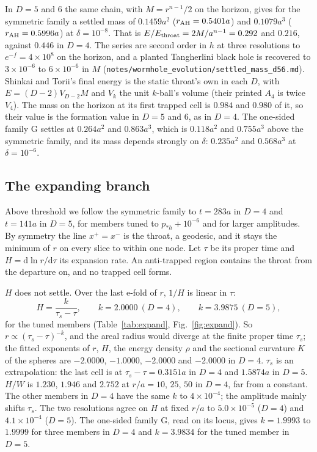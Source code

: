 \documentclass[11pt]{article}
\newcommand{\dd}{\mathrm{d}}
\newcommand{\pst}{p_{*h}}
\newcommand{\AH}{{\rm AH}}
\begin{document}
In $D=5$ and $6$ the same chain, with $M=r^{n-1}/2$ on the horizon, gives for the symmetric family a settled mass of
$0.1459a^{2}$ ($r_\AH=0.5401a$) and $0.1079a^{3}$ ($r_\AH=0.5996a$) at $\delta=10^{-8}$. That is $E/E_{\rm throat}=2M/a^{n-1}=0.292$
and $0.216$, against $0.446$ in $D=4$. The series are second order in $h$ at three resolutions to $e^{-f}=4\times10^{8}$ on the
horizon, and a planted Tangherlini black hole is recovered to $3\times10^{-6}$ to $6\times10^{-6}$ in $M$
(\texttt{notes/wormhole\_evolution/settled\_mass\_d56.md}). Shinkai and Torii's final energy is the static throat's own in each
$D$, with $E=(D-2)V_{D-2}M$ and $V_k$ the unit $k$-ball's volume (their printed $A_4$ is twice $V_4$). The mass on the horizon at its
first trapped cell is $0.984$ and $0.980$ of it, so their value is the formation value in $D=5$ and $6$, as in $D=4$. The one-sided
family G settles at $0.264a^{2}$ and $0.863a^{3}$, which is $0.118a^{2}$ and $0.755a^{3}$ above the symmetric family, and its mass
depends strongly on $\delta$: $0.235a^{2}$ and $0.568a^{3}$ at $\delta=10^{-6}$.

\subsection{The expanding branch}\label{sec:expand}

Above threshold we follow the symmetric family to $t=283a$ in $D=4$ and $t=141a$ in $D=5$, for members tuned to
$\pst+10^{-6}$ and for larger amplitudes. By symmetry the line $x^+=x^-$ is the throat, a geodesic, and it stays the
minimum of $r$ on every slice to within one node. Let $\tau$ be its proper time and $H=\dd\ln r/\dd\tau$ its expansion
rate. An anti-trapped region contains the throat from the departure on, and no trapped cell forms.

$H$ does not settle. Over the last e-fold of $r$, $1/H$ is linear in $\tau$:
\begin{equation}
H=\frac{k}{\tau_s-\tau},\qquad k=2.0000\ (D=4),\qquad k=3.9875\ (D=5),\label{eq:ft}
\end{equation}
for the tuned members (Table~\ref{tab:expand}, Fig.~\ref{fig:expand}). So $r\propto(\tau_s-\tau)^{-k}$, and the areal
radius would diverge at the finite proper time $\tau_s$; the fitted exponents of $r$, $H$, the energy density $\rho$ and
the sectional curvature $K$ of the spheres are $-2.0000$, $-1.0000$, $-2.0000$ and $-2.0000$ in $D=4$. $\tau_s$ is an
extrapolation: the last cell is at $\tau_s-\tau=0.3151a$ in $D=4$ and $1.5874a$ in $D=5$. $H/W$ is $1.230$, $1.946$ and
$2.752$ at $r/a=10$, $25$, $50$ in $D=4$, far from a constant. The other members in $D=4$ have the same $k$ to
$4\times10^{-4}$; the amplitude mainly shifts $\tau_s$. The two resolutions agree on $H$ at fixed $r/a$ to
$5.0\times10^{-5}$ ($D=4$) and $4.1\times10^{-4}$ ($D=5$). The one-sided family G, read on its locus, gives
$k=1.9993$ to $1.9999$ for three members in $D=4$ and $k=3.9834$ for the tuned member in $D=5$.
\end{document}
